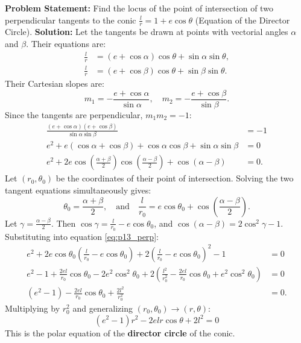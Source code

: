 \begin{examplebox}
\textbf{Problem Statement:}
Find the locus of the point of intersection of two perpendicular tangents to the conic $\frac{l}{r} = 1 + e\cos\theta$ (Equation of the Director Circle).
\tcblower
\textbf{Solution:}
Let the tangents be drawn at points with vectorial angles $\alpha$ and $\beta$.
Their equations are:
\begin{align}
    \frac{l}{r} &= (e + \cos\alpha)\cos\theta + \sin\alpha\sin\theta, \\
    \frac{l}{r} &= (e + \cos\beta)\cos\theta + \sin\beta\sin\theta.
\end{align}
Their Cartesian slopes are:
\begin{equation}
    m_1 = -\frac{e + \cos\alpha}{\sin\alpha}, \quad m_2 = -\frac{e + \cos\beta}{\sin\beta}.
\end{equation}
Since the tangents are perpendicular, $m_1 m_2 = -1$:
\begin{align}
    \frac{(e + \cos\alpha)(e + \cos\beta)}{\sin\alpha\sin\beta} &= -1 \nonumber\\
    e^2 + e(\cos\alpha + \cos\beta) + \cos\alpha\cos\beta + \sin\alpha\sin\beta &= 0 \nonumber\\
    e^2 + 2e\cos\left(\frac{\alpha+\beta}{2}\right)\cos\left(\frac{\alpha-\beta}{2}\right) + \cos(\alpha - \beta) &= 0. \label{eq:p13_perp}
\end{align}
Let $(r_0, \theta_0)$ be the coordinates of their point of intersection.
Solving the two tangent equations simultaneously gives:
\begin{equation}
    \theta_0 = \frac{\alpha + \beta}{2}, \quad \text{and} \quad \frac{l}{r_0} = e\cos\theta_0 + \cos\left(\frac{\alpha - \beta}{2}\right).
\end{equation}
Let $\gamma = \frac{\alpha - \beta}{2}$. Then $\cos\gamma = \frac{l}{r_0} - e\cos\theta_0$, and $\cos(\alpha - \beta) = 2\cos^2\gamma - 1$.
Substituting into equation \eqref{eq:p13_perp}:
\begin{align}
    e^2 + 2e\cos\theta_0\left(\frac{l}{r_0} - e\cos\theta_0\right) + 2\left(\frac{l}{r_0} - e\cos\theta_0\right)^2 - 1 &= 0 \nonumber\\
    e^2 - 1 + \frac{2el}{r_0}\cos\theta_0 - 2e^2\cos^2\theta_0 + 2\left(\frac{l^2}{r_0^2} - \frac{2el}{r_0}\cos\theta_0 + e^2\cos^2\theta_0\right) &= 0 \nonumber\\
    (e^2 - 1) - \frac{2el}{r_0}\cos\theta_0 + \frac{2l^2}{r_0^2} &= 0.
\end{align}
Multiplying by $r_0^2$ and generalizing $(r_0, \theta_0) \to (r, \theta)$:
\begin{equation}
    \boxed{(e^2 - 1)r^2 - 2elr\cos\theta + 2l^2 = 0}
\end{equation}
This is the polar equation of the \textbf{director circle} of the conic.
\end{examplebox}

